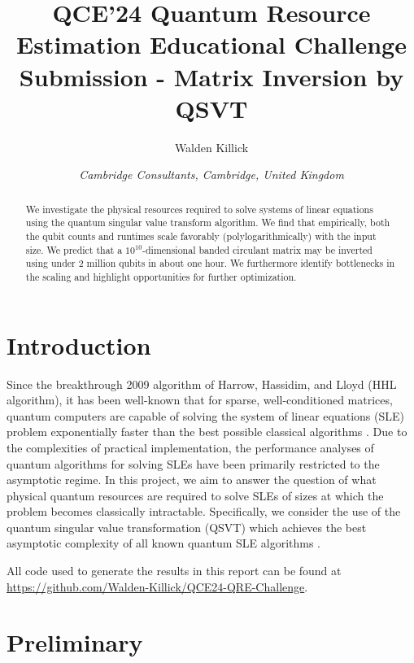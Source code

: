 \documentclass[10pt, twocolumn]{article}
\begin{document}
\title{QCE'24 Quantum Resource Estimation Educational Challenge Submission - Matrix Inversion by QSVT}
\author{Walden Killick}
\date{\textit{Cambridge Consultants, Cambridge, United Kingdom}}

\maketitle

\begin{abstract}
	We investigate the physical resources required to solve systems of linear equations using the quantum singular value transform algorithm. We find that empirically, both the qubit counts and runtimes scale favorably (polylogarithmically) with the input size. We predict that a $10^{10}$-dimensional banded circulant matrix may be inverted using under 2 million qubits in about one hour. We furthermore identify bottlenecks in the scaling and highlight opportunities for further optimization.
\end{abstract}

\section{Introduction}

Since the breakthrough 2009 algorithm of Harrow, Hassidim, and Lloyd (HHL algorithm), it has been well-known that for sparse, well-conditioned matrices, quantum computers are capable of solving the system of linear equations (SLE) problem exponentially faster than the best possible classical algorithms \cite{harrow2009quantum}. Due to the complexities of practical implementation, the performance analyses of quantum algorithms for solving SLEs have been primarily restricted to the asymptotic regime. In this project, we aim to answer the question of what physical quantum resources are required to solve SLEs of sizes at which the problem becomes classically intractable. Specifically, we consider the use of the quantum singular value transformation (QSVT) which achieves the best asymptotic complexity of all known quantum SLE algorithms \cite{gilyen2019quantum, martyn2021grand}.

All code used to generate the results in this report can  be found at \href{https://github.com/Walden-Killick/QCE24-QRE-Challenge}{https://github.com/Walden-Killick/QCE24-QRE-Challenge}.

\section{Preliminary}
\end{document}
